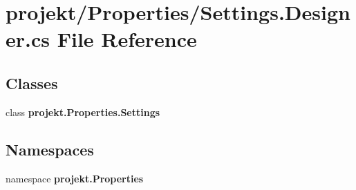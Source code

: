 \section{projekt/\+Properties/\+Settings.Designer.\+cs File Reference}
\label{Settings_8Designer_8cs}
\subsection*{Classes}
\begin{DoxyCompactItemize}
\item 
class {\bfseries projekt.\+Properties.\+Settings}
\end{DoxyCompactItemize}
\subsection*{Namespaces}
\begin{DoxyCompactItemize}
\item 
namespace \textbf{ projekt.\+Properties}
\end{DoxyCompactItemize}
